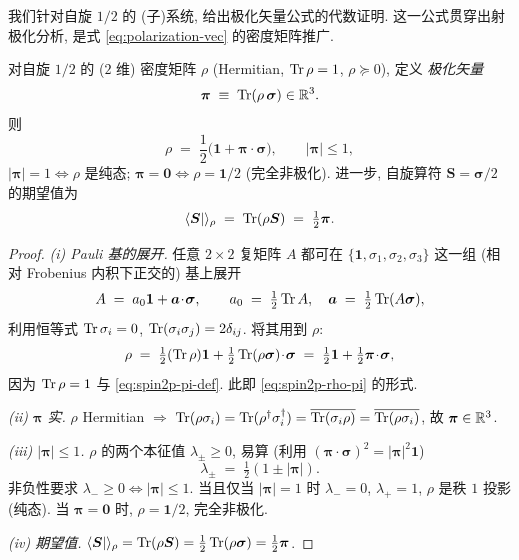 我们针对自旋 $1/2$ 的 (子)系统, 给出极化矢量公式的代数证明. 这一公式贯穿出射极化分析, 是式 \eqref{eq:polarization-vec} 的密度矩阵推广.

\begin{theorem}\label{thm:spin2p-polvec}
对自旋 $1/2$ 的 ($2$ 维) 密度矩阵 $\rho$ (Hermitian, $\operatorname{Tr}\rho=1$, $\rho\succeq 0$), 定义 \emph{极化矢量}
\begin{equation}
  \bm\pi\;\equiv\;\operatorname{Tr}(\rho\,\bm\sigma)\in\mathbb{R}^3.
  \label{eq:spin2p-pi-def}
\end{equation}
则
\begin{equation}
  \rho\;=\;\frac{1}{2}\bigl(\mathbf 1+\bm\pi\!\cdot\!\bm\sigma\bigr),
  \qquad |\bm\pi|\le 1,
  \label{eq:spin2p-rho-pi}
\end{equation}
$|\bm\pi|=1\iff\rho$ 是纯态; $\bm\pi=\bm 0\iff\rho=\mathbf 1/2$ (完全非极化). 进一步, 自旋算符 $\bm S=\bm\sigma/2$ 的期望值为
\begin{equation}
  \bra{\bm S}\rangle_\rho\;=\;\operatorname{Tr}(\rho\bm S)\;=\;\tfrac12\bm\pi.
\end{equation}
\end{theorem}

\begin{proof}
\emph{(i) Pauli 基的展开.} 任意 $2\times 2$ 复矩阵 $A$ 都可在 $\{\mathbf 1,\sigma_1,\sigma_2,\sigma_3\}$ 这一组 (相对 Frobenius 内积下正交的) 基上展开
\begin{equation}
  A\;=\;a_0\mathbf 1+\bm a\!\cdot\!\bm\sigma,\qquad
  a_0\;=\;\tfrac12\operatorname{Tr} A,\quad\bm a\;=\;\tfrac12\operatorname{Tr}(A\bm\sigma),
  \label{eq:spin2p-pauli-decomp}
\end{equation}
利用恒等式 $\operatorname{Tr}\sigma_i=0$, $\operatorname{Tr}(\sigma_i\sigma_j)=2\delta_{ij}$. 将其用到 $\rho$:
\begin{equation}
  \rho\;=\;\tfrac12(\operatorname{Tr}\rho)\mathbf 1+\tfrac12\operatorname{Tr}(\rho\bm\sigma)\!\cdot\!\bm\sigma
  \;=\;\tfrac12\mathbf 1+\tfrac12\bm\pi\!\cdot\!\bm\sigma,
\end{equation}
因为 $\operatorname{Tr}\rho=1$ 与 \eqref{eq:spin2p-pi-def}. 此即 \eqref{eq:spin2p-rho-pi} 的形式.

\emph{(ii) $\bm\pi$ 实.} $\rho$ Hermitian $\Rightarrow$ $\operatorname{Tr}(\rho\sigma_i)=\operatorname{Tr}(\rho^\dagger\sigma_i^\dagger)=\overline{\operatorname{Tr}(\sigma_i\rho)}=\overline{\operatorname{Tr}(\rho\sigma_i)}$, 故 $\bm\pi\in\mathbb{R}^3$.

\emph{(iii) $|\bm\pi|\le 1$.} $\rho$ 的两个本征值 $\lambda_\pm\ge 0$, 易算 (利用 $(\bm\pi\!\cdot\!\bm\sigma)^2=|\bm\pi|^2\mathbf 1$)
\begin{equation}
  \lambda_\pm\;=\;\tfrac12(1\pm|\bm\pi|).
\end{equation}
非负性要求 $\lambda_-\ge 0\iff|\bm\pi|\le 1$. 当且仅当 $|\bm\pi|=1$ 时 $\lambda_-=0$, $\lambda_+=1$, $\rho$ 是秩 $1$ 投影 (纯态). 当 $\bm\pi=\bm 0$ 时, $\rho=\mathbf 1/2$, 完全非极化.

\emph{(iv) 期望值.} $\bra{\bm S}\rangle_\rho=\operatorname{Tr}(\rho\bm S)=\tfrac12\operatorname{Tr}(\rho\bm\sigma)=\tfrac12\bm\pi$.
\end{proof}

